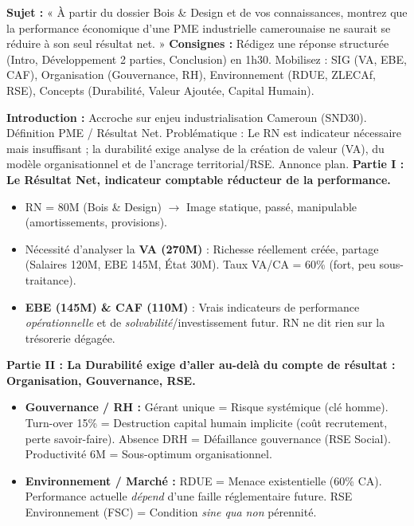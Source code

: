 \documentclass[11pt]{article}
\begin{document}
\begin{exercice}
\textbf{Sujet :} « À partir du dossier Bois \& Design et de vos connaissances, montrez que la performance économique d'une PME industrielle camerounaise ne saurait se réduire à son seul résultat net. »
\textbf{Consignes :} Rédigez une réponse structurée (Intro, Développement 2 parties, Conclusion) en 1h30. Mobilisez : SIG (VA, EBE, CAF), Organisation (Gouvernance, RH), Environnement (RDUE, ZLECAf, RSE), Concepts (Durabilité, Valeur Ajoutée, Capital Humain).
\end{exercice}

\begin{corrige}
\textbf{Introduction :} Accroche sur enjeu industrialisation Cameroun (SND30). Définition PME / Résultat Net. Problématique : Le RN est indicateur nécessaire mais insuffisant ; la durabilité exige analyse de la création de valeur (VA), du modèle organisationnel et de l'ancrage territorial/RSE. Annonce plan.
\textbf{Partie I : Le Résultat Net, indicateur comptable réducteur de la performance.}
\begin{itemize}
    \item RN = 80M (Bois \& Design) $\rightarrow$ Image statique, passé, manipulable (amortissements, provisions).
    \item Nécessité d'analyser la \textbf{VA (270M)} : Richesse réellement créée, partage (Salaires 120M, EBE 145M, État 30M). Taux VA/CA = 60\% (fort, peu sous-traitance).
    \item \textbf{EBE (145M) \& CAF (110M)} : Vrais indicateurs de performance \textit{opérationnelle} et de \textit{solvabilité}/investissement futur. RN ne dit rien sur la trésorerie dégagée.
\end{itemize}
\textbf{Partie II : La Durabilité exige d'aller au-delà du compte de résultat : Organisation, Gouvernance, RSE.}
\begin{itemize}
    \item \textbf{Gouvernance / RH :} Gérant unique = Risque systémique (clé homme). Turn-over 15\% = Destruction capital humain implicite (coût recrutement, perte savoir-faire). Absence DRH = Défaillance gouvernance (RSE Social). Productivité 6M = Sous-optimum organisationnel.
    \item \textbf{Environnement / Marché :} RDUE = Menace existentielle (60\% CA). Performance actuelle \textit{dépend} d'une faille réglementaire future. RSE Environnement (FSC) = Condition \textit{sine qua non} pérennité.

\end{itemize}
\end{corrige}
\end{document}
